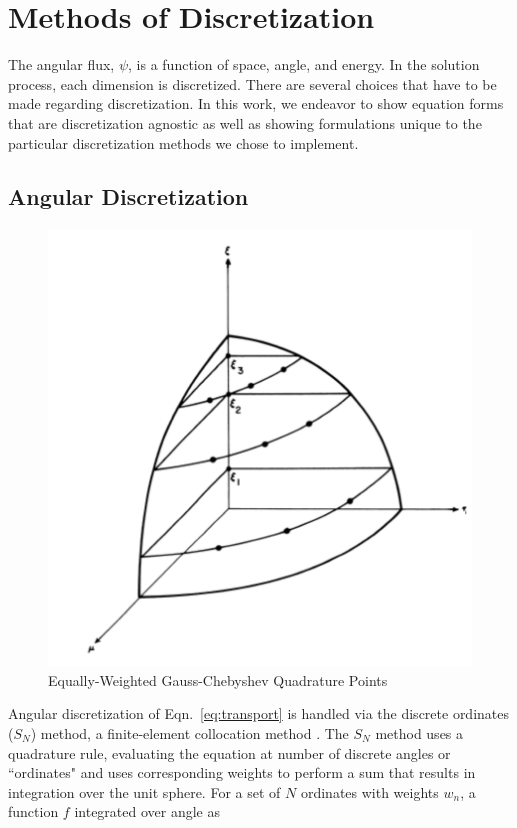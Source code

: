 \section{Methods of Discretization}
The angular flux, $\psi$, is a function of space, angle, and energy. In the solution process, each dimension is discretized. There are several choices that have to be made regarding discretization. In this work, we endeavor to show equation forms that are discretization agnostic as well as showing formulations unique to the particular discretization methods we chose to implement. 

\subsection{Angular Discretization}


%
\begin{figure}[H]
    \centering
    \includegraphics[width=.5\textwidth]{fig/SNPoints.png}
    \caption{Equally-Weighted Gauss-Chebyshev Quadrature Points \cite{Lathrop1965}}
    \label{fig:SN}
\end{figure}
%
Angular discretization of Eqn.~\eqref{eq:transport} is handled via the discrete ordinates ($S_N$) method, a finite-element collocation method \cite{Lathrop1965}. The $S_N$ method uses a quadrature rule, evaluating the equation at number of discrete angles or ``ordinates" and uses corresponding weights to perform a sum that results in integration over the unit sphere. 
For a set of $N$ ordinates with weights $w_n$, a function $f$ integrated over angle as
